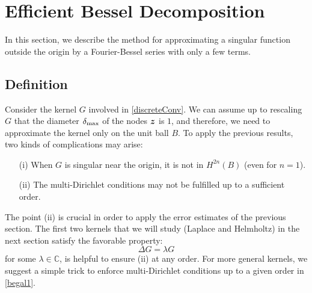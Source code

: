 \documentclass[main]{subfiles}
\begin{document}
\section{Efficient Bessel Decomposition}
\label{sec:EBD}		
In this section, we describe the method for approximating a singular function outside the origin by a Fourier-Bessel series with only a few terms. 
\subsection{Definition}
\label{sub:defEBD}					
Consider the kernel $G$ involved in \eqref{discreteConv}. We can assume up to rescaling $G$ that the diameter $\delta_{\max}$ of the nodes $\boldsymbol{z}$ is $1$, and therefore, we need to approximate the kernel only on the unit ball $B$. To apply the previous results, two kinds of complications may arise:
\begin{itemize}
	\item[(i)] When $G$ is singular near the origin, it is not in $H^{2n}(B)$ (even for $n=1$). 
	\item[(ii)] The multi-Dirichlet conditions may not be fulfilled up to a sufficient order.
\end{itemize}

The point (ii) is crucial in order to apply the error estimates of the previous section. The first two kernels that we will study (Laplace and Helmholtz) in the next section satisfy the favorable property:
\[\Delta G = \lambda G\]
for some $\lambda \in \mathbb{C}$, is helpful to ensure (ii) at any order. For more general kernels, we suggest a simple trick to enforce multi-Dirichlet conditions up to a given order in \autoref{begal1}. 
\end{document}
